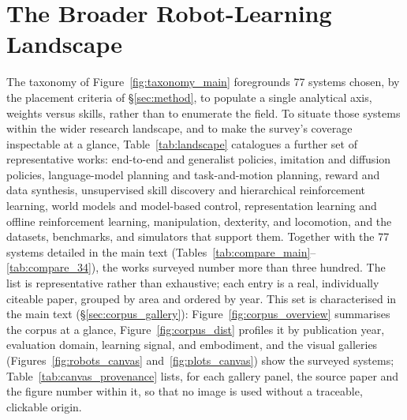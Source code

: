 \appendix
\section{The Broader Robot-Learning Landscape}
\label{sec:landscape}

The taxonomy of Figure~\ref{fig:taxonomy_main} foregrounds 77 systems chosen, by the placement
criteria of \S\ref{sec:method}, to populate a single analytical axis, weights versus skills, rather
than to enumerate the field. To situate those systems
within the wider research landscape, and to make the survey's coverage inspectable at a glance,
Table~\ref{tab:landscape} catalogues a further set of representative works: end-to-end and generalist
policies, imitation and diffusion policies, language-model planning and task-and-motion planning,
reward and data synthesis, unsupervised skill discovery and hierarchical reinforcement learning, world
models and model-based control, representation learning and offline reinforcement learning,
manipulation, dexterity, and locomotion, and the datasets, benchmarks, and simulators that support
them. Together with the 77 systems detailed in the main text
(Tables~\ref{tab:compare_main}--\ref{tab:compare_34}), the works surveyed number more than three
hundred. The list is representative rather than exhaustive; each entry is a real, individually
citeable paper, grouped by area and ordered by year. This set is characterised in the main text
(\S\ref{sec:corpus_gallery}): Figure~\ref{fig:corpus_overview} summarises the corpus at a glance,
Figure~\ref{fig:corpus_dist} profiles it by publication year, evaluation domain, learning signal,
and embodiment, and the visual galleries (Figures~\ref{fig:robots_canvas} and~\ref{fig:plots_canvas})
show the surveyed systems; Table~\ref{tab:canvas_provenance} lists, for each gallery panel, the
source paper and the figure number within it, so that no image is used without a traceable,
clickable origin.




